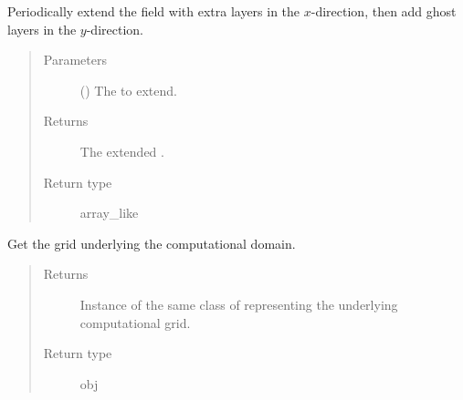 \documentclass[letterpaper,10pt,english]{sphinxmanual}
\begin{document}
\begin{fulllineitems}

\begin{fulllineitems}
\label{\detokenize{api:dycore.horizontal_boundary_periodic.PeriodicXZ.from_physical_to_computational_domain}}
Periodically extend the field  with  extra layers in the \(x\)-direction,
then add  ghost layers in the \(y\)-direction.
\begin{quote}\begin{description}
\item[{Parameters}] \leavevmode
{} () \textendash{} The  to extend.

\item[{Returns}] \leavevmode
The extended .

\item[{Return type}] \leavevmode
array\_like

\end{description}\end{quote}

\end{fulllineitems}


\begin{fulllineitems}
\label{\detokenize{api:dycore.horizontal_boundary_periodic.PeriodicXZ.get_computational_grid}}
Get the  grid underlying the computational domain.
\begin{quote}\begin{description}
\item[{Returns}] \leavevmode
Instance of the same class of 
representing the underlying computational grid.

\item[{Return type}] \leavevmode
obj


\end{description}
\end{quote}
\end{fulllineitems}
\end{fulllineitems}
\end{document}
